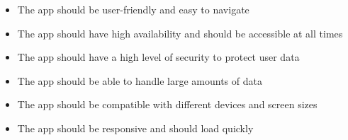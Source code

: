 \begin{itemize}
\item The app should be user-friendly and easy to navigate
\item The app should have high availability and should be accessible at all times
\item The app should have a high level of security to protect user data
\item The app should be able to handle large amounts of data
\item The app should be compatible with different devices and screen sizes
\item The app should be responsive and should load quickly

\end{itemize}



\clearpage